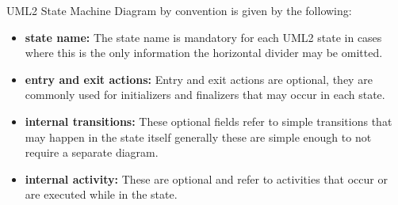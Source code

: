 \begin{definition}
UML2 State Machine Diagram by convention is given by the following:

\label{def:uml2}
\begin{itemize}
	\item \textbf{state name:} The state name is mandatory for each UML2 state in cases where this is the only information the horizontal divider may be omitted.
	\item \textbf{entry and exit actions:} Entry and exit actions are optional, they are commonly used for initializers and finalizers that may occur in each state.
	\item \textbf{internal transitions:} These optional fields refer to simple transitions that may happen in the state itself generally these are simple enough to not require a separate diagram.
	\item \textbf{internal activity:} These are optional and refer to activities that occur or are executed while in the state.
\end{itemize}
\end{definition}
